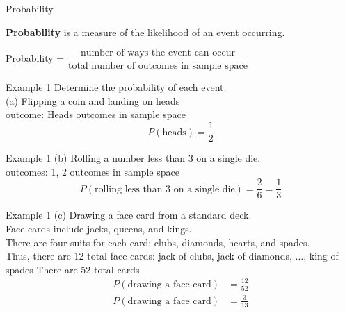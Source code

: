\documentclass[t]{beamer}
\begin{document}
\begin{frame}{Probability}
\begin{tcolorbox}[colframe=green!20!black, colback = green!30!white,title=\textbf{Probability}]
\textbf{Probability} is a measure of the likelihood of an event occurring.
\end{tcolorbox}
\vspace{6pt} \pause
\begin{center}
Probability = $\dfrac{\text{number of ways the event can occur}}{\text{total number of outcomes in sample space}}$
\end{center}
\end{frame}

\begin{frame}{Example 1}
Determine the probability of each event.	\newline\\
(a)	\quad	Flipping a coin and landing on heads \newline\\	 outcome: Heads	\quad {} outcomes in sample space \pause
\[P(\text{heads}) = \frac{1}{2}\]
\end{frame}

\begin{frame}{Example 1}
(b)	\quad Rolling a number less than 3 on a single die.	\newline\\	 outcomes: 1, 2	\quad	{} outcomes in sample space \pause
\[P(\text{rolling less than 3 on a single die}) = \frac{2}{6} = \frac{1}{3} \]
\end{frame}

\begin{frame}{Example 1}
(c)	\quad	Drawing a face card from a standard deck.	\newline\\	\pause
Face cards include jacks, queens, and kings. \newline\\	\pause
There are four suits for each card: clubs, diamonds, hearts, and spades.	\newline\\	\pause
Thus, there are 12 total face cards: jack of clubs, jack of diamonds, $\dots$, king of spades	\quad \pause There are 52 total cards	\pause
\begin{align*}
P(\text{drawing a face card}) &= \frac{12}{52} \\[6pt]	
P(\text{drawing a face card}) &= \frac{3}{13}
\end{align*}
\end{frame}
\end{document}
